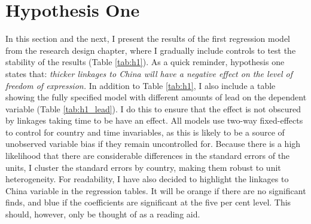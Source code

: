 \section{Hypothesis One} \label{sec:h1}
In this section and the next, I present the results of the first regression model from the research design chapter, where I gradually include controls to test the stability of the results (Table \ref{tab:h1}). As a quick reminder, hypothesis one states that: \textit{thicker linkages to China will have a negative effect on the level of freedom of expression.} In addition to Table \ref{tab:h1}, I also include a table showing the fully specified model with different amounts of lead on the dependent variable (Table \ref{tab:h1_lead}). I do this to ensure that the effect is not obscured by  linkages taking time to be have an effect. All models use two-way fixed-effects to control for country and time invariables, as this is likely to be a source of unobserved variable bias if they remain uncontrolled for. Because there is a high likelihood that there are considerable differences in the standard errors of the units, I cluster the standard errors by country, making them robust to unit heterogeneity. For readability, I have also decided to highlight the linkages to China variable in the regression tables. It will be orange if there are no significant finds, and blue if the coefficients are significant at the five per cent level. This should, however, only be thought of as a reading aid. 

